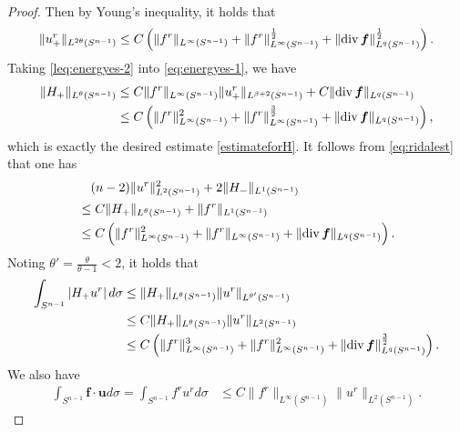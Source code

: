 \documentclass[12pt]{amsart}
\renewcommand{\div}{{\rm div \thinspace }}
\newcommand{\Bu}{{\boldsymbol{u}}}
\newcommand{\Bf}{{\boldsymbol{f}}}
\begin{document}
\begin{proof}
	Then by Young's inequality, it holds that  
	\begin{equation}\label{leq:energyes-2}
		\|u^r_+\|_{L^{2\theta}(S^{n-1})} 
		\leq C\left(\|f^r\|_{L^{\infty}(S^{n-1})}+ \|f^r\|_{L^{\infty}(S^{n-1})}^{\frac{1}{2}}  + \|\div \Bf\|_{L^q(S^{n-1})}^{\frac{1}{2}}\right).
	\end{equation}
	Taking \eqref{leq:energyes-2} into \eqref{eq:energyes-1}, we have
	\begin{equation}
		\begin{aligned}
			\|H_+\|_{L^{\theta}(S^{n-1})}  &  \leq C\|f^r\|_{L^{\infty}(S^{n-1})}\|u^r_+\|_{L^{\beta+2}(S^{n-1})} + C \|\div \Bf\|_{L^q(S^{n-1})} \\
			&\leq C \left( \|f^r\|_{L^{\infty}(S^{n-1})}^2 + \|f^r\|_{L^{\infty}(S^{n-1})}^{\frac{3}{2}}+  \|\div \Bf\|_{L^q(S^{n-1})} \right),
		\end{aligned}
	\end{equation}  
	which is exactly the desired estimate \eqref{estimateforH}. 
	It follows from \eqref{eq:ridalest} that one has
	\begin{equation}\label{estimateforur}
		\begin{aligned}
			&\quad (n-2)\|u^r\|_{L^2(S^{n-1})}^2 + 2\|H_-\|_{L^1(S^{n-1})} \\
			& \leq C 	\|H_+\|_{L^{\theta}(S^{n-1})} +  \|f^r\|_{L^1(S^{n-1})} \\
			&\leq C\left( \|f^r\|_{L^{\infty}(S^{n-1})}^2 + \|f^r\|_{L^{\infty}(S^{n-1})}+ 
			\|\div \Bf\|_{L^q(S^{n-1})} \right) .
		\end{aligned}
	\end{equation}
	Noting $\theta'=\frac{\theta}{\theta-1}<2$, it holds that 
	\begin{equation}\label{eq:estiofH+u}
		\begin{aligned}
			\int_{S^{n-1}}	\left|	H_+u^r\right|  d\sigma &\leq \|H_+\|_{L^{\theta}(S^{n-1})}\|u^r\|_{L^{\theta'}(S^{n-1})}\\
			& \le C
			\|H_+\|_{L^{\theta}(S^{n-1})}\|u^r\|_{L^{2}(S^{n-1})}
			\\ & \leq C \left( \|f^r\|_{L^{\infty}(S^{n-1})}^3 + \|f^r\|_{L^{\infty}(S^{n-1})}^2+ 
			\|\div \Bf\|_{L^q(S^{n-1})}^{\frac32} \right) .
		\end{aligned}
	\end{equation}
	We also have
	\begin{equation}\label{eq:estfu}
		\begin{aligned}
			\int_{S^{n-1}} \Bf\cdot \Bu d\sigma  =\int_{S^{n-1}} f^ru^r d\sigma &\leq C\|f^r\|_{L^{\infty}(S^{n-1})} \|u^r\|_{L^2(S^{n-1})}. 

\end{aligned}
\end{equation}
\end{proof}
\end{document}
